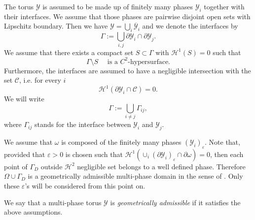 \documentclass[reqno,10pt]{amsart}
\numberwithin{equation}{section}
\theoremstyle{remark}
\newcommand{\calC}{\mathcal{C}}
\newcommand{\calH}{\mathcal{H}}
\newcommand{\calY}{\mathcal{Y}}
\newcommand{\closure}[1]{\overline{#1}}
\newcommand{\Dir}{D}
\newcommand{\eps}{\varepsilon}
\begin{document}
The torus $\calY$ is assumed to be made up of finitely many phases $\calY_i$ together with their interfaces. 
We assume that those phases are pairwise disjoint open sets with Lipschitz boundary.
Then we have $\calY = \bigcup_{i} \closure{\calY}_i$ and we denote the interfaces by 
\begin{equation*}
	\Gamma := \bigcup_{i,j} \partial\calY_i \cap \partial\calY_j.
\end{equation*}
We assume that there exists a compact set $S \subset \Gamma$ with $\calH^{1}(S) = 0$ such that
\begin{equation} \label{interface regularity condition}
	\Gamma \setminus S \quad \text{ is a $C^2$-hypersurface.}
\end{equation}
Furthermore, the interfaces are assumed to have a negligible intersection with the set $\calC$, i.e. for every $i$
\begin{equation} \label{transversality condition}
	\calH^{1}(\partial\calY_i \cap \calC) = 0.
\end{equation}
We will write
\begin{equation*}
	\Gamma := \bigcup_{i \neq j} \Gamma_{ij},
\end{equation*}
where $\Gamma_{ij}$ stands for the interface between $\calY_i$ and $\calY_j$.

We assume that $\omega$ is composed of the finitely many phases $(\calY_i)_\eps$. 
Note that, provided that $\eps>0$ is chosen such that $\calH^1(\cup_i(\partial \calY_i)_{\eps} \cap \partial \omega)=0$, then each point of $\Gamma_\Dir$ outside $\calH^2$ negligible set belongs to a well defined phase. 
Therefore $\Omega \cup \Gamma_\Dir$ is a geometrically admissible multi-phase domain in the sense of \cite[Subsection 1.2]{Francfort.Giacomini.2012}. 
Only these $\eps$'s will be considered from this point on. 

We say that a multi-phase torus $\calY$ is \emph{geometrically admissible} if it satisfies the above assumptions.

\medskip
{} \nopagebreak
\end{document}
